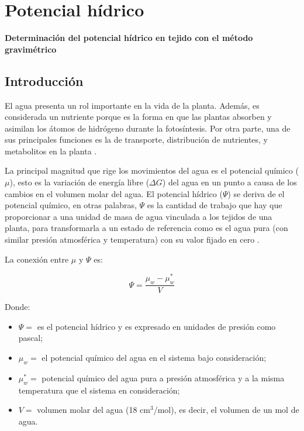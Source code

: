 
\chapter[Determinaci\'on del potencial h\'idrico]{Potencial h\'idrico}

\begin{huge}
	\begin{center}
		\textbf{Determinaci\'on del potencial h\'idrico en tejido con el m\'etodo gravim\'etrico}
	\end{center}
\end{huge}

\hspace{0.2cm}

\section{Introducci\'on}

El agua presenta un rol importante en la vida de la planta. Adem\'as, es considerada un nutriente porque es la forma en que las plantas absorben y asimilan los \'atomos de hidr\'ogeno durante la fotos\'intesis. Por otra parte, una de sus principales funciones es la de transporte, distribuci\'on de nutrientes, y metabolitos en la planta \citep{kirkham2014principles}. 

La principal magnitud que rige los movimientos del agua es el potencial qu\'imico ($\mu$), esto es la variaci\'on de energ\'ia libre ($\Delta G$) del agua en un punto a causa de los cambios en el volumen molar del agua. El potencial h\'idrico ($\Psi$) se deriva de el potencial qu\'imico, en otras palabras, $\Psi$ es la cantidad de trabajo que hay que proporcionar a una unidad de masa de agua vinculada a los tejidos de una planta, para transformarla a un estado de referencia como es el agua pura (con similar  presi\'on atmosf\'erica y temperatura) con su valor fijado en cero \citep{roger2001handbook}.

La conexi\'on entre $\mu$ y $\Psi$ es:

$$\Psi = \frac{\mu_w - \mu_w^{*}}{V} $$ 

Donde:

\begin{itemize}
	\item $\Psi = $ es el potencial h\'idrico y es expresado en unidades de presi\'on como pascal;
	\item  $\mu_w = $ el potencial qu\'imico del agua en el sistema bajo consideraci\'on;
	\item $\mu_w^{*} = $ potencial qu\'imico del agua pura a presi\'on atmosf\'erica y a la misma temperatura que el sistema en consideraci\'on;
	\item $V = $ volumen molar del agua (18 cm$^3$/mol), es decir, el volumen de un mol de agua.
\end{itemize}

